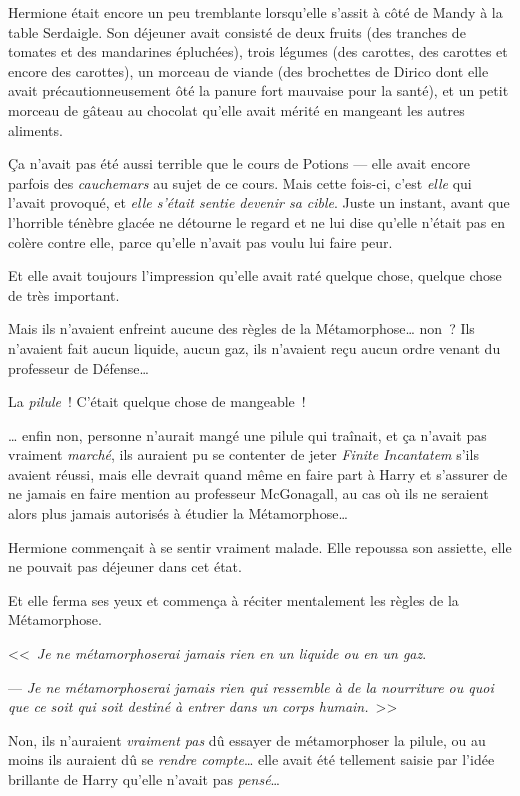 \later

Hermione était encore un peu tremblante lorsqu'elle s'assit à côté de Mandy à la table Serdaigle. Son déjeuner avait consisté de deux fruits (des tranches de tomates et des mandarines épluchées), trois légumes (des carottes, des carottes et encore des carottes), un morceau de viande (des brochettes de Dirico dont elle avait précautionneusement ôté la panure fort mauvaise pour la santé), et un petit morceau de gâteau au chocolat qu'elle avait mérité en mangeant les autres aliments.

Ça n'avait pas été aussi terrible que le cours de Potions --- elle avait encore parfois des \emph{cauchemars} au sujet de ce cours. Mais cette fois-ci, c'est \emph{elle} qui l'avait provoqué, et \emph{elle s'était sentie devenir sa cible}. Juste un instant, avant que l'horrible ténèbre glacée ne détourne le regard et ne lui dise qu'elle n'était pas en colère contre elle, parce qu'elle n'avait pas voulu lui faire peur.

Et elle avait toujours l'impression qu'elle avait raté quelque chose, quelque chose de très important.

Mais ils n'avaient enfreint aucune des règles de la Métamorphose… non~? Ils n'avaient fait aucun liquide, aucun gaz, ils n'avaient reçu aucun ordre venant du professeur de Défense…

La \emph{pilule}~! C'était quelque chose de mangeable~!

… enfin non, personne n'aurait mangé une pilule qui traînait, et ça n'avait pas vraiment \emph{marché}, ils auraient pu se contenter de jeter \emph{Finite Incantatem} s'ils avaient réussi, mais elle devrait quand même en faire part à Harry et s'assurer de ne jamais en faire mention au professeur McGonagall, au cas où ils ne seraient alors plus jamais autorisés à étudier la Métamorphose…

Hermione commençait à se sentir vraiment malade. Elle repoussa son assiette, elle ne pouvait pas déjeuner dans cet état.

Et elle ferma ses yeux et commença à réciter mentalement les règles de la Métamorphose.

<<~\emph{Je ne métamorphoserai jamais rien en un liquide ou en un gaz}.

--- \emph{Je ne métamorphoserai jamais rien qui ressemble à de la nourriture ou quoi que ce soit qui soit destiné à entrer dans un corps humain.}~>>

Non, ils n'auraient \emph{vraiment pas} dû essayer de métamorphoser la pilule, ou au moins ils auraient dû se \emph{rendre compte}… elle avait été tellement saisie par l'idée brillante de Harry qu'elle n'avait pas \emph{pensé}…

